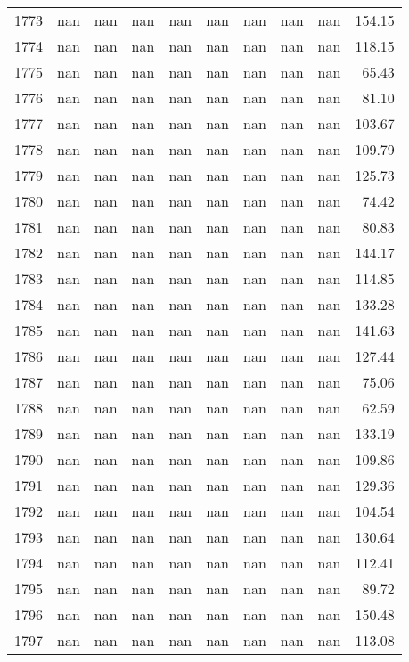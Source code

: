 \begin{tabular}{lrrrrrrrrr}
1773 & nan & nan & nan & nan & nan & nan & nan & nan & 154.15 \\
1774 & nan & nan & nan & nan & nan & nan & nan & nan & 118.15 \\
1775 & nan & nan & nan & nan & nan & nan & nan & nan & 65.43 \\
1776 & nan & nan & nan & nan & nan & nan & nan & nan & 81.10 \\
1777 & nan & nan & nan & nan & nan & nan & nan & nan & 103.67 \\
1778 & nan & nan & nan & nan & nan & nan & nan & nan & 109.79 \\
1779 & nan & nan & nan & nan & nan & nan & nan & nan & 125.73 \\
1780 & nan & nan & nan & nan & nan & nan & nan & nan & 74.42 \\
1781 & nan & nan & nan & nan & nan & nan & nan & nan & 80.83 \\
1782 & nan & nan & nan & nan & nan & nan & nan & nan & 144.17 \\
1783 & nan & nan & nan & nan & nan & nan & nan & nan & 114.85 \\
1784 & nan & nan & nan & nan & nan & nan & nan & nan & 133.28 \\
1785 & nan & nan & nan & nan & nan & nan & nan & nan & 141.63 \\
1786 & nan & nan & nan & nan & nan & nan & nan & nan & 127.44 \\
1787 & nan & nan & nan & nan & nan & nan & nan & nan & 75.06 \\
1788 & nan & nan & nan & nan & nan & nan & nan & nan & 62.59 \\
1789 & nan & nan & nan & nan & nan & nan & nan & nan & 133.19 \\
1790 & nan & nan & nan & nan & nan & nan & nan & nan & 109.86 \\
1791 & nan & nan & nan & nan & nan & nan & nan & nan & 129.36 \\
1792 & nan & nan & nan & nan & nan & nan & nan & nan & 104.54 \\
1793 & nan & nan & nan & nan & nan & nan & nan & nan & 130.64 \\
1794 & nan & nan & nan & nan & nan & nan & nan & nan & 112.41 \\
1795 & nan & nan & nan & nan & nan & nan & nan & nan & 89.72 \\
1796 & nan & nan & nan & nan & nan & nan & nan & nan & 150.48 \\
1797 & nan & nan & nan & nan & nan & nan & nan & nan & 113.08 \\

\end{tabular}
